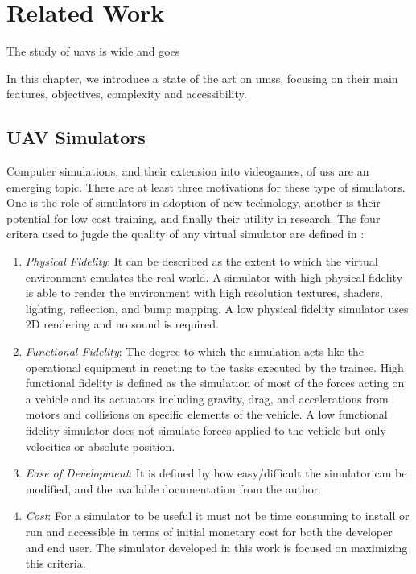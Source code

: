 
\chapter{Related Work} %
\label{Chapter2}

The study of \glspl{uav} is wide and goes

In this chapter, we introduce a state of the art on \glspl{ums}, focusing on their main features, objectives, complexity and accessibility.

\section{UAV Simulators}
Computer simulations, and their extension into videogames, of \glspl{us} are an emerging topic. There are at least three motivations for these type of simulators. One is the role of simulators in adoption of new technology, another is their potential for low cost training, and finally their utility in research. The four critera used to jugde the quality of any virtual simulator are defined in \cite{alexander2005gaming}:
\begin{enumerate}
\item \emph{Physical Fidelity}: It can be described as the extent to which the virtual environment emulates the real world. A simulator with high physical fidelity is able to render the environment with high resolution textures, shaders, lighting, reflection, and bump mapping. A low physical fidelity simulator uses 2D rendering and no sound is required.

\item \emph{Functional Fidelity}: The degree to which the simulation acts like the operational equipment in reacting to the tasks executed by the trainee. High functional fidelity is defined as the simulation of most of the forces acting on a vehicle and its actuators including gravity, drag, and accelerations from motors and collisions on specific elements of the vehicle. A low functional fidelity simulator does not simulate forces applied to the vehicle but only velocities or absolute position.

\item \emph{Ease of Development}: It is defined by how easy/difficult the simulator can be modified, and the available documentation from the author.

\item \emph{Cost}: For a simulator to be useful it must not be time consuming to install or run and accessible in terms of initial monetary cost for both the developer and end user. The simulator developed in this work is focused on maximizing this criteria.
\end{enumerate}

